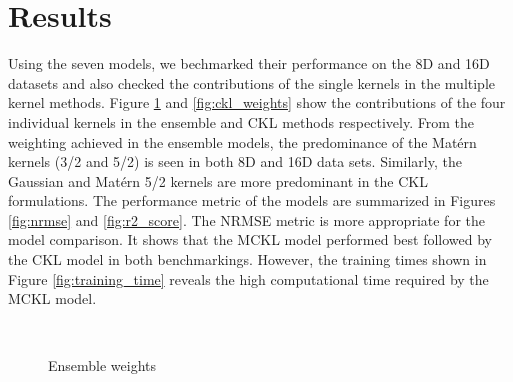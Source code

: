 \documentclass[11pt, letterpaper]{article}
\begin{document}
\section{Results}
Using the seven models, we bechmarked their performance on the 8D and 16D datasets and also checked the contributions of the single kernels in the multiple kernel methods. Figure \ref{fig:ensemble_weights} and \ref{fig:ckl_weights} show the contributions of the four individual kernels in the ensemble and CKL methods respectively. From the weighting achieved in the ensemble models, the predominance of the Mat\'ern kernels (3/2 and 5/2) is seen in both 8D and 16D data sets. Similarly, the Gaussian and Mat\'ern 5/2 kernels are more predominant in the CKL formulations. The performance metric of the models are summarized in Figures \ref{fig:nrmse} and \ref{fig:r2_score}. The NRMSE metric is more appropriate for the model comparison. It shows that the MCKL model performed best followed by the CKL model in both benchmarkings. However, the training times shown in Figure \ref{fig:training_time} reveals the high computational time required by the MCKL model. 
\begin{figure}[!h]
	\begin{center}
		\vspace{-10pt}
		\mbox{  
			 }
		\caption{Ensemble weights}
		\label{fig:ensemble_weights}
	\end{center}
\end{figure}
\end{document}
